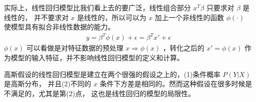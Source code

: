 \documentclass[letterpaper,10pt,english]{sphinxmanual}
\begin{document}
实际上，线性回归模型比我们看上去的要广泛，线性组合部分 \(x^T \beta\) 只要求对 \(\beta\) 是线性的，
并不要求对 \(x\) 是线性的，所以可以为 \(x\) 加上一个非线性的函数 \(\phi(\cdot)\)
使模型具有拟合非线性数据的能力。
\begin{equation}\label{equation:线性回归/content:线性回归/content:9}
\begin{split}y=\beta^T \phi(x) + \epsilon =\beta^T x' + \epsilon\end{split}
\end{equation}
\(\phi(x)\) 可以看做是对特征数据的预处理 \(x \Rightarrow \phi(x)\)
，转化之后的 \(x'=\phi(x)\) 作为模型的输入特征，并不影响线性回归模型的定义和计算。

高斯假设的线性回归模型是建立在两个很强的假设之上的，(1)条件概率 \(P(Y|X)\) 是高斯分布，
并且(2)不同的 \(x\) 条件下方差是相同的。然而这种假设在很多时候是不满足的，尤其是第(2)点，
这也是线性回归的模型的局限性。
\end{document}
